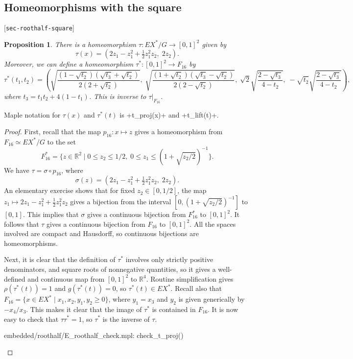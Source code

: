 \documentclass[reqno]{amsart}
\newcommand{\lbl}[1]{\label{#1}\textup{[\texttt{#1}]}\par}
\newcommand{\lbl}{\label}
\newcommand{\sg}        {\sigma}
\newcommand{\R}         {{\mathbb{R}}}
\newcommand{\st}        {\;|\;}
\newcommand{\half}      {\tfrac{1}{2}}
\newcommand{\rt}        {\sqrt{2}}
\renewcommand{\:}{\colon}
\newtheorem{proposition}[theorem]{Proposition}
\theoremstyle{definition}
\begin{document}
\subsection{Homeomorphisms with the square}
\lbl{sec-roothalf-square}

\begin{proposition}
 There is a homeomorphism $\tau\:EX^*/G\to [0,1]^2$ given by
 \[ \tau(x) = (2z_1-z_1^2+\half z_1^2z_2,\;2z_2). \]
 Moreover, we can define a homeomorphism $\tau^*\:[0,1]^2\to F_{16}$ by
 \[ \tau^*(t_1,t_2) = \left(
     \sqrt{\frac{(1-\sqrt{t_2})(\sqrt{t_3}+\sqrt{t_2})}{2(2+\sqrt{t_2})}},\;
     \sqrt{\frac{(1+\sqrt{t_2})(\sqrt{t_3}-\sqrt{t_2})}{2(2-\sqrt{t_2})}},\;
     \rt\sqrt{\frac{2-\sqrt{t_3}}{4-t_2}},\;
     -\sqrt{t_2}\sqrt{\frac{2-\sqrt{t_3}}{4-t_2}}
    \right),
 \]
 where $t_3=t_1t_2+4(1-t_1)$.  This is inverse to $\tau|_{F_{16}}$.
\end{proposition}
Maple notation for $\tau(x)$ and $\tau^*(t)$ is \mcode+t_proj(x)+ and
\mcode+t_lift(t)+.
\begin{proof}
 First, recall that the map $p_{16}\:x\mapsto z$ gives a homeomorphism
 from $F_{16}\simeq EX^*/G$ to the set
 \[ F^*_{16} = \{z\in \R^2\st 0\leq z_2\leq 1/2,\;
                0\leq z_1\leq (1+\sqrt{z_2/2})^{-1}\}.
 \]
 We have $\tau=\sg\circ p_{16}$, where
 \[ \sg(z) = (2z_1-z_1^2+\half z_1^2z_2,\;2z_2). \]
 An elementary exercise shows that for fixed $z_2\in[0,1/2]$, the map
 $z_1\mapsto 2z_1-z_1^2+\half z_1^2z_2$ gives a bijection from the
 interval $[0,(1+\sqrt{z_2/2})^{-1}]$ to $[0,1]$.  This implies that
 $\sg$ gives a continuous bijection from $F^*_{16}$ to $[0,1]^2$.  It
 follows that $\tau$ gives a continuous bijection from $F_{16}$ to
 $[0,1]^2$.  All the spaces involved are compact and Hausdorff, so
 continuous bijections are homeomorphisms.

 Next, it is clear that the definition of $\tau^*$ involves only
 strictly positive denominators, and square roots of nonnegative
 quantities, so it gives a well-defined and continuous map from
 $[0,1]^2$ to $\R^4$.  Routine simplification gives
 $\rho(\tau^*(t))=1$ and $g(\tau^*(t))=0$, so $\tau^*(t)\in EX^*$.
 Recall also that $F_{16}=\{x\in EX^*\st x_1,x_2,y_1,y_2\geq 0\}$,
 where $y_1=x_3$ and $y_2$ is given generically by $-x_4/x_3$.  This
 makes it clear that the image of $\tau^*$ is contained in $F_{16}$.
 It is now easy to check that $\tau\tau^*=1$, so $\tau^*$ is the
 inverse of $\tau$.
 \begin{checks}
  embedded/roothalf/E_roothalf_check.mpl: check_t_proj()
 \end{checks}
\end{proof}
\end{document}
